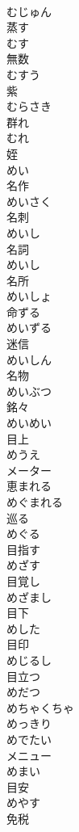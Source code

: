 \documentclass[8pt]{extreport}
\begin{document}
\begin{CJK}{UTF8}{min}
\\	むじゅん	
\\	蒸す 
\\	むす	
\\	無数 
\\	むすう	
\\	紫 
\\	むらさき	
\\	群れ 
\\	むれ	
\\	姪 
\\	めい	
\\	名作 
\\	めいさく	
\\	名刺 
\\	めいし	
\\	名詞 
\\	めいし	
\\	名所 
\\	めいしょ	
\\	命ずる 
\\	めいずる	
\\	迷信 
\\	めいしん	
\\	名物 
\\	めいぶつ	
\\	銘々 
\\	めいめい	
\\	目上 
\\	めうえ	
\\	メーター	
\\	恵まれる 
\\	めぐまれる	
\\	巡る 
\\	めぐる	
\\	目指す 
\\	めざす	
\\	目覚し 
\\	めざまし	
\\	目下 
\\	めした	
\\	目印 
\\	めじるし	
\\	目立つ 
\\	めだつ	
\\	めちゃくちゃ	
\\	めっきり	
\\	めでたい	
\\	メニュー	
\\	めまい	
\\	目安 
\\	めやす	
\\	免税 

\end{CJK}
\end{document}
